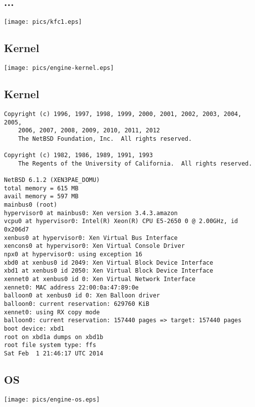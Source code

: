 \documentclass[xga]{xdvislides}
\begin{document}
\subsection{...}
\begin{center}
	\texttt{[image: pics/kfc1.eps]}
\end{center}

\subsection{Kernel}
\begin{center}
        \texttt{[image: pics/engine-kernel.eps]}
\end{center}

\subsection{Kernel}
\small
\begin{verbatim}
Copyright (c) 1996, 1997, 1998, 1999, 2000, 2001, 2002, 2003, 2004, 2005,
    2006, 2007, 2008, 2009, 2010, 2011, 2012
    The NetBSD Foundation, Inc.  All rights reserved.

Copyright (c) 1982, 1986, 1989, 1991, 1993
    The Regents of the University of California.  All rights reserved.

NetBSD 6.1.2 (XEN3PAE_DOMU)
total memory = 615 MB
avail memory = 597 MB
mainbus0 (root)
hypervisor0 at mainbus0: Xen version 3.4.3.amazon
vcpu0 at hypervisor0: Intel(R) Xeon(R) CPU E5-2650 0 @ 2.00GHz, id 0x206d7
xenbus0 at hypervisor0: Xen Virtual Bus Interface
xencons0 at hypervisor0: Xen Virtual Console Driver
npx0 at hypervisor0: using exception 16
xbd0 at xenbus0 id 2049: Xen Virtual Block Device Interface
xbd1 at xenbus0 id 2050: Xen Virtual Block Device Interface
xennet0 at xenbus0 id 0: Xen Virtual Network Interface
xennet0: MAC address 22:00:0a:47:89:0e
balloon0 at xenbus0 id 0: Xen Balloon driver
balloon0: current reservation: 629760 KiB
xennet0: using RX copy mode
balloon0: current reservation: 157440 pages => target: 157440 pages
boot device: xbd1
root on xbd1a dumps on xbd1b
root file system type: ffs
Sat Feb  1 21:46:17 UTC 2014
\end{verbatim}
\Normalsize

\subsection{OS}
\begin{center}
	\texttt{[image: pics/engine-os.eps]}
\end{center}
\end{document}
